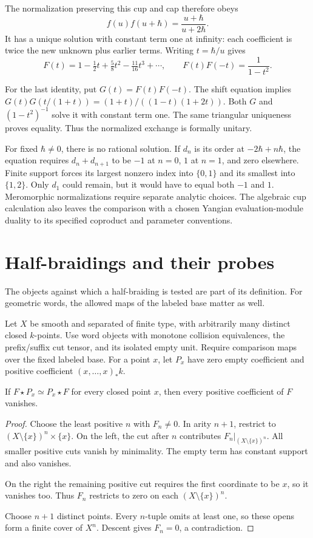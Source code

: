 The normalization preserving this cup and cap therefore obeys
\[
 f(u)f(u+\hbar)=\frac{u+\hbar}{u+2\hbar}.
\]
It has a unique solution with constant term one at infinity:
each coefficient is twice the new unknown plus earlier terms.
Writing $t=\hbar/u$ gives
\[
 F(t)=1-\tfrac12t+\tfrac58t^2-\tfrac{11}{16}t^3+\cdots,
 \qquad F(t)F(-t)=\frac1{1-t^2}.
\]

For the last identity, put $G(t)=F(t)F(-t)$.
The shift equation implies
$G(t)G(t/(1+t))=(1+t)/((1-t)(1+2t))$.
Both $G$ and $(1-t^2)^{-1}$ solve it with constant term one.
The same triangular uniqueness proves equality.
Thus the normalized exchange is formally unitary.

For fixed $\hbar\ne0$, there is no rational solution.
If $d_n$ is its order at $-2\hbar+n\hbar$, the equation
requires $d_n+d_{n+1}$ to be $-1$ at $n=0$, $1$ at $n=1$,
and zero elsewhere. Finite support forces its largest
nonzero index into $\{0,1\}$ and its smallest into
$\{1,2\}$. Only $d_1$ could remain, but it would have to
equal both $-1$ and $1$.
Meromorphic normalizations require separate analytic choices.
The algebraic cup calculation also leaves the comparison
with a chosen Yangian evaluation-module duality to its
specified coproduct and parameter conventions.

\section{Half-braidings and their probes}
\label{v4-arith:centers:sec:probes}

The objects against which a half-braiding is tested are
part of its definition. For geometric words, the allowed
maps of the labeled base matter as well.

Let $X$ be smooth and separated of finite type, with
arbitrarily many distinct closed $k$-points.
Use word objects with monotone collision equivalences,
the prefix/suffix cut tensor, and its isolated empty unit.
Require comparison maps over the fixed labeled base.
For a point $x$, let $P_x$ have zero empty coefficient
and positive coefficient $(x,\ldots,x)_*k$.

\begin{proposition}
\label{v4-arith:centers:prop:point-probes}
If $F\star P_x\simeq P_x\star F$ for every closed point $x$,
then every positive coefficient of $F$ vanishes.
\end{proposition}

\begin{proof}
Choose the least positive $n$ with $F_n\ne0$.
In arity $n+1$, restrict to
$(X\setminus\{x\})^n\times\{x\}$.
On the left, the cut after $n$ contributes
$F_n|_{(X\setminus\{x\})^n}$.
All smaller positive cuts vanish by minimality.
The empty term has constant support and also vanishes.

On the right the remaining positive cut requires
the first coordinate to be $x$, so it vanishes too.
Thus $F_n$ restricts to zero on each
$(X\setminus\{x\})^n$.

Choose $n+1$ distinct points. Every $n$-tuple omits
at least one, so these opens form a finite cover of $X^n$.
Descent gives $F_n=0$, a contradiction.
\end{proof}

